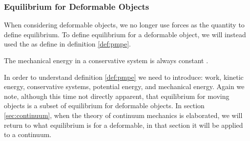 



\subsubsection{Equilibrium for Deformable Objects}
\label{sec:equilibrium-for-deobj}
When considering deformable objects, we no longer use forces as
the quantity to define equilibrium.
%
%
To define equilibrium for a deformable object, we will instead used
the  as define in
definition \vref{def:pmpe}.
 
\begin{definition}
\label{def:pmpe}
The mechanical energy in a conservative system is always constant
.
\end{definition}

In order to understand definition \vref{def:pmpe} we need to
introduce: work, kinetic energy, conservative systems, potential
energy, and mechanical energy. Again we note, although this time not
directly apparent, that equilibrium for moving objects is a subset of
equilibrium for deformable objects. In section \vref{sec:continuum},
when the theory of continuum mechanics is elaborated, we will return
to what equilibrium is for a deformable, in that section it will be
applied to a continuum.

